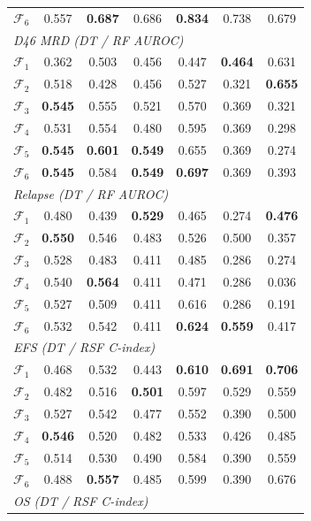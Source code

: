 \documentclass[pdflatex,sn-nature]{sn-jnl}
\begin{document}
\begin{appendices}
\begin{table}[p]
\begin{tabular}{@{}l cc cc cc@{}}
$\mathcal{F}_6$ & 0.557 & \textbf{0.687} & 0.686 & \textbf{0.834} & 0.738 & 0.679 \\
\multicolumn{7}{l}{\textit{D46 MRD (DT / RF AUROC)}} \\
$\mathcal{F}_1$ & 0.362 & 0.503 & 0.456 & 0.447 & \textbf{0.464} & 0.631 \\
$\mathcal{F}_2$ & 0.518 & 0.428 & 0.456 & 0.527 & 0.321 & \textbf{0.655} \\
$\mathcal{F}_3$ & \textbf{0.545} & 0.555 & 0.521 & 0.570 & 0.369 & 0.321 \\
$\mathcal{F}_4$ & 0.531 & 0.554 & 0.480 & 0.595 & 0.369 & 0.298 \\
$\mathcal{F}_5$ & \textbf{0.545} & \textbf{0.601} & \textbf{0.549} & 0.655 & 0.369 & 0.274 \\
$\mathcal{F}_6$ & \textbf{0.545} & 0.584 & \textbf{0.549} & \textbf{0.697} & 0.369 & 0.393 \\
\multicolumn{7}{l}{\textit{Relapse (DT / RF AUROC)}} \\
$\mathcal{F}_1$ & 0.480 & 0.439 & \textbf{0.529} & 0.465 & 0.274 & \textbf{0.476} \\
$\mathcal{F}_2$ & \textbf{0.550} & 0.546 & 0.483 & 0.526 & 0.500 & 0.357 \\
$\mathcal{F}_3$ & 0.528 & 0.483 & 0.411 & 0.485 & 0.286 & 0.274 \\
$\mathcal{F}_4$ & 0.540 & \textbf{0.564} & 0.411 & 0.471 & 0.286 & 0.036 \\
$\mathcal{F}_5$ & 0.527 & 0.509 & 0.411 & 0.616 & 0.286 & 0.191 \\
$\mathcal{F}_6$ & 0.532 & 0.542 & 0.411 & \textbf{0.624} & \textbf{0.559} & 0.417 \\
\multicolumn{7}{l}{\textit{EFS (DT / RSF C-index)}} \\
$\mathcal{F}_1$ & 0.468 & 0.532 & 0.443 & \textbf{0.610} & \textbf{0.691} & \textbf{0.706} \\
$\mathcal{F}_2$ & 0.482 & 0.516 & \textbf{0.501} & 0.597 & 0.529 & 0.559 \\
$\mathcal{F}_3$ & 0.527 & 0.542 & 0.477 & 0.552 & 0.390 & 0.500 \\
$\mathcal{F}_4$ & \textbf{0.546} & 0.520 & 0.482 & 0.533 & 0.426 & 0.485 \\
$\mathcal{F}_5$ & 0.514 & 0.530 & 0.490 & 0.584 & 0.390 & 0.559 \\
$\mathcal{F}_6$ & 0.488 & \textbf{0.557} & 0.485 & 0.599 & 0.390 & 0.676 \\
\multicolumn{7}{l}{\textit{OS (DT / RSF C-index)}} \\

\end{tabular}
\end{table}
\end{appendices}
\end{document}
